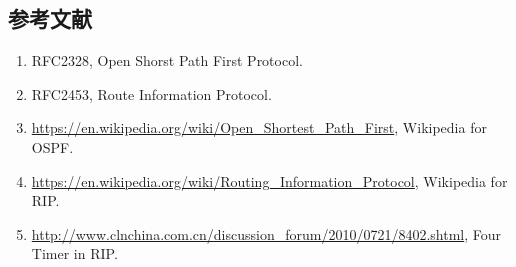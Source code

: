 \documentclass[15pt]{ctexart}
\begin{document}




\newpage
\begin{appendices}
    \section{参考文献} %
        \begin{enumerate}
        \item RFC2328, Open Shorst Path First Protocol.
        \item RFC2453, Route Information Protocol.
        \item \url{https://en.wikipedia.org/wiki/Open_Shortest_Path_First}, Wikipedia for OSPF.
        \item \url{https://en.wikipedia.org/wiki/Routing_Information_Protocol}, Wikipedia for RIP.
        \item \url{http://www.clnchina.com.cn/discussion_forum/2010/0721/8402.shtml}, Four Timer in RIP.
        \end{enumerate}
\end{appendices}
\end{document}
